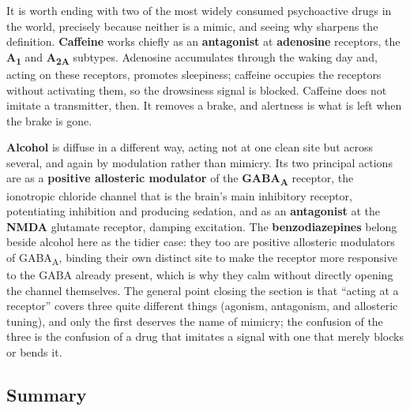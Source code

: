 \documentclass[11pt]{article}
\begin{document}
It is worth ending with two of the most widely consumed psychoactive drugs in the world, precisely because neither is a mimic, and seeing why sharpens the definition. \textbf{Caffeine} works chiefly as an \textbf{antagonist} at \textbf{adenosine} receptors, the \textbf{A\textsubscript{1}} and \textbf{A\textsubscript{2A}} subtypes. Adenosine accumulates through the waking day and, acting on these receptors, promotes sleepiness; caffeine occupies the receptors without activating them, so the drowsiness signal is blocked. Caffeine does not imitate a transmitter, then. It removes a brake, and alertness is what is left when the brake is gone.

\textbf{Alcohol} is diffuse in a different way, acting not at one clean site but across several, and again by modulation rather than mimicry. Its two principal actions are as a \textbf{positive allosteric modulator} of the \textbf{GABA\textsubscript{A}} receptor, the ionotropic chloride channel that is the brain's main inhibitory receptor, potentiating inhibition and producing sedation, and as an \textbf{antagonist} at the \textbf{NMDA} glutamate receptor, damping excitation. The \textbf{benzodiazepines} belong beside alcohol here as the tidier case: they too are positive allosteric modulators of GABA\textsubscript{A}, binding their own distinct site to make the receptor more responsive to the GABA already present, which is why they calm without directly opening the channel themselves. The general point closing the section is that ``acting at a receptor'' covers three quite different things (agonism, antagonism, and allosteric tuning), and only the first deserves the name of mimicry; the confusion of the three is the confusion of a drug that imitates a signal with one that merely blocks or bends it.

\subsection{Summary}
\end{document}
